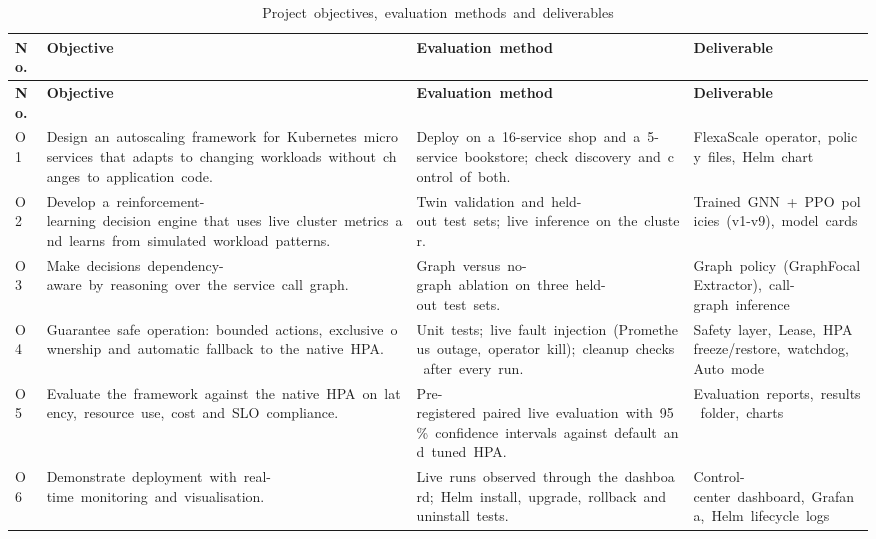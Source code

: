 \documentclass[12pt,a4paper,oneside]{report}
\begin{document}
\begingroup\small\setlength{\tabcolsep}{4pt}\renewcommand{\arraystretch}{1.25}
\begin{longtable}{|>{\raggedright\arraybackslash}p{1.00cm}|>{\raggedright\arraybackslash}p{5.40cm}|>{\raggedright\arraybackslash}p{4.55cm}|>{\raggedright\arraybackslash}p{3.27cm}|}
\caption{Project~objectives,~evaluation~methods~and~deliverables}\label{tab:objectives}\\\hline
\textbf{No.} & \textbf{Objective} & \textbf{Evaluation~method} & \textbf{Deliverable}\\\hline\endfirsthead
\hline \textbf{No.} & \textbf{Objective} & \textbf{Evaluation~method} & \textbf{Deliverable}\\\hline\endhead
O1 & Design~an~autoscaling~framework~for~Kubernetes~microservices~that~adapts~to~changing~workloads~without~changes~to~application~code. & Deploy~on~a~16-service~shop~and~a~5-service~bookstore;~check~discovery~and~control~of~both. & FlexaScale~operator,~policy~files,~Helm~chart\\\hline
O2 & Develop~a~reinforcement-learning~decision~engine~that~uses~live~cluster~metrics~and~learns~from~simulated~workload~patterns. & Twin~validation~and~held-out~test~sets;~live~inference~on~the~cluster. & Trained~GNN~+~PPO~policies~(v1-v9),~model~cards\\\hline
O3 & Make~decisions~dependency-aware~by~reasoning~over~the~service~call~graph. & Graph~versus~no-graph~ablation~on~three~held-out~test~sets. & Graph~policy~(GraphFocalExtractor),~call-graph~inference\\\hline
O4 & Guarantee~safe~operation:~bounded~actions,~exclusive~ownership~and~automatic~fallback~to~the~native~HPA. & Unit~tests;~live~fault~injection~(Prometheus~outage,~operator~kill);~cleanup~checks~after~every~run. & Safety~layer,~Lease,~HPA~freeze/restore,~watchdog,~Auto~mode\\\hline
O5 & Evaluate~the~framework~against~the~native~HPA~on~latency,~resource~use,~cost~and~SLO~compliance. & Pre-registered~paired~live~evaluation~with~95\%~confidence~intervals~against~default~and~tuned~HPA. & Evaluation~reports,~results~folder,~charts\\\hline
O6 & Demonstrate~deployment~with~real-time~monitoring~and~visualisation. & Live~runs~observed~through~the~dashboard;~Helm~install,~upgrade,~rollback~and~uninstall~tests. & Control-center~dashboard,~Grafana,~Helm~lifecycle~logs\\\hline
\end{longtable}\endgroup
\end{document}
